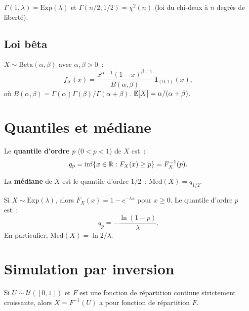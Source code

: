 \begin{remarque}
$\Gamma(1, \lambda) = \text{Exp}(\lambda)$ et $\Gamma(n/2, 1/2) = \chi^2(n)$
(loi du chi-deux \`a $n$ degr\'es de libert\'e).
\end{remarque}

\subsection{Loi b\^eta}

\begin{definition}[B\^eta]
$X \sim \text{Beta}(\alpha, \beta)$ avec $\alpha, \beta > 0$~:
\[
    f_X(x) = \frac{x^{\alpha-1}(1-x)^{\beta-1}}{B(\alpha,\beta)}\,
    \mathbf{1}_{(0,1)}(x),
\]
o\`u $B(\alpha,\beta) = \Gamma(\alpha)\Gamma(\beta)/\Gamma(\alpha+\beta)$.
$\mathbb{E}[X] = \alpha/(\alpha+\beta)$.
\end{definition}

\section{Quantiles et m\'ediane}

\begin{definition}[Quantile]
Le \textbf{quantile d'ordre $p$} ($0 < p < 1$) de $X$ est~:
\[
    q_p = \inf\{x \in \mathbb{R} : F_X(x) \geq p\} = F_X^{-1}(p).
\]
\end{definition}

\begin{definition}[M\'ediane]
La \textbf{m\'ediane} de $X$ est le quantile d'ordre $1/2$~:
$\text{Med}(X) = q_{1/2}$.
\end{definition}

\begin{exemple}
Si $X \sim \text{Exp}(\lambda)$, alors $F_X(x) = 1 - e^{-\lambda x}$ pour $x \geq 0$.
Le quantile d'ordre $p$ est~:
\[
    q_p = -\frac{\ln(1-p)}{\lambda}.
\]
En particulier, $\text{Med}(X) = \ln 2 / \lambda$.
\end{exemple}

\section{Simulation par inversion}

\begin{theoreme}
Si $U \sim \mathcal{U}([0,1])$ et $F$ est une fonction de r\'epartition continue
strictement croissante, alors $X = F^{-1}(U)$ a pour fonction de r\'epartition $F$.
\end{theoreme}

